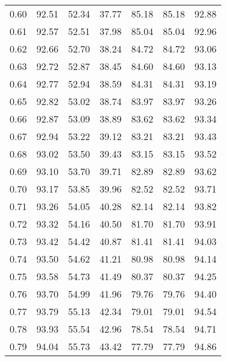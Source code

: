 \begin{tabular}{|c|c|c|c|c|c|c|}
      0.60 &     92.51 &     52.34 &      37.77 &   85.18 &      85.18 &         92.88 \\
      0.61 &     92.57 &     52.51 &      37.98 &   85.04 &      85.04 &         92.96 \\
      0.62 &     92.66 &     52.70 &      38.24 &   84.72 &      84.72 &         93.06 \\
      0.63 &     92.72 &     52.87 &      38.45 &   84.60 &      84.60 &         93.13 \\
      0.64 &     92.77 &     52.94 &      38.59 &   84.31 &      84.31 &         93.19 \\
      0.65 &     92.82 &     53.02 &      38.74 &   83.97 &      83.97 &         93.26 \\
      0.66 &     92.87 &     53.09 &      38.89 &   83.62 &      83.62 &         93.34 \\
      0.67 &     92.94 &     53.22 &      39.12 &   83.21 &      83.21 &         93.43 \\
      0.68 &     93.02 &     53.50 &      39.43 &   83.15 &      83.15 &         93.52 \\
      0.69 &     93.10 &     53.70 &      39.71 &   82.89 &      82.89 &         93.62 \\
      0.70 &     93.17 &     53.85 &      39.96 &   82.52 &      82.52 &         93.71 \\
      0.71 &     93.26 &     54.05 &      40.28 &   82.14 &      82.14 &         93.82 \\
      0.72 &     93.32 &     54.16 &      40.50 &   81.70 &      81.70 &         93.91 \\
      0.73 &     93.42 &     54.42 &      40.87 &   81.41 &      81.41 &         94.03 \\
      0.74 &     93.50 &     54.62 &      41.21 &   80.98 &      80.98 &         94.14 \\
      0.75 &     93.58 &     54.73 &      41.49 &   80.37 &      80.37 &         94.25 \\
      0.76 &     93.70 &     54.99 &      41.96 &   79.76 &      79.76 &         94.40 \\
      0.77 &     93.79 &     55.13 &      42.34 &   79.01 &      79.01 &         94.54 \\
      0.78 &     93.93 &     55.54 &      42.96 &   78.54 &      78.54 &         94.71 \\
      0.79 &     94.04 &     55.73 &      43.42 &   77.79 &      77.79 &         94.86 \\

\end{tabular}
